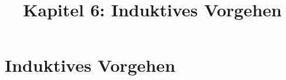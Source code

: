 \documentclass[18pt]{beamer}
\title[Aussagenlogik]{Kapitel 6: Induktives Vorgehen}
\begin{document}

\begin{frame}
 \titlepage
\end{frame}

\def\showSolutions{1}					 %

\section{Induktives Vorgehen}
\title[Induktives Vorgehen]{}

\end{document}
